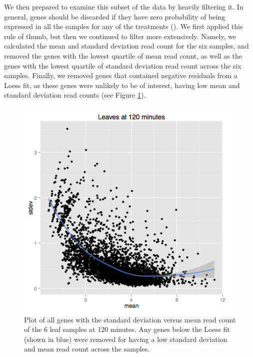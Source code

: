 \documentclass[11pt,a4paper,oldfontcommands,openany]{memoir}
\numberwithin{equation}{section} %
\begin{document}
We then prepared to examine this subset of the data by heavily filtering it. In general, genes should be discarded if they have zero probability of being expressed in all the samples for any of the treatments (\citealt{edger}). We first applied this rule of thumb, but then we continued to filter more extensively. Namely, we calculated the mean and standard deviation read count for the six samples, and removed the genes with the lowest quartile of mean read count, as well as the genes with the lowest quartile of standard deviation read count across the six samples. Finally, we removed genes that contained negative residuals from a Loess fit, as these genes were unlikely to be of interest, having low mean and standard deviation read counts (see Figure \ref{fig:loessL120}).

\begin{figure}[H]
    \begin{framed}
    \centering
    \includegraphics[width=\textwidth]{loessL120}
    \end{framed}
    \caption{Plot of all genes with the standard deviation versus mean read count of the 6 leaf samples at 120 minutes. Any genes below the Loess fit (shown in blue) were removed for having a low standard deviation and mean read count across the samples.}
    \label{fig:loessL120}
\end{figure}
\end{document}
